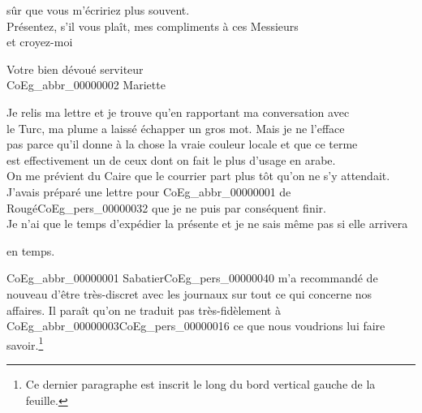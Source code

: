 \documentclass{book}
\begin{document}
sûr que vous m’écririez plus souvent.\\
\indent Présentez, s’il vous plaît, mes compliments à ces Messieurs\\
et croyez-moi
\begin{center}\hspace{5cm} Votre bien dévoué serviteur\\
\hspace{5cm} \gls{CoEg_abbr_00000002} Mariette\end{center}
\indent Je relis ma lettre et je trouve qu’en rapportant ma conversation avec\\
le Turc, ma plume a laissé échapper un gros mot. Mais je ne l’efface\\
pas parce qu’il donne à la chose la vraie couleur locale et que ce terme\\
est effectivement un de ceux dont on fait le plus d’usage en arabe.\\
\indent On me prévient du Caire que le courrier part plus tôt qu’on ne s’y attendait.\\
J’avais préparé une lettre pour \gls{CoEg_abbr_00000001} de Rougé\gls{CoEg_pers_00000032} que je ne puis par conséquent finir.\\
Je n’ai que le temps d’expédier la présente et je ne sais même pas si elle arrivera
\begin{flushright}en temps.\end{flushright}
{\footnotesize \indent \gls{CoEg_abbr_00000001} Sabatier\gls{CoEg_pers_00000040} m’a recommandé de nouveau d’être très-discret avec les journaux sur tout ce qui concerne nos\\
affaires. Il paraît qu’on ne traduit pas très-fidèlement à \gls{CoEg_abbr_00000003}\gls{CoEg_pers_00000016} ce que nous voudrions lui faire savoir.}\footnote{Ce dernier paragraphe est inscrit le long du bord vertical gauche de la feuille.}
\hypertarget{CoEg_Mariette_1857-02-20}{}
\end{document}
